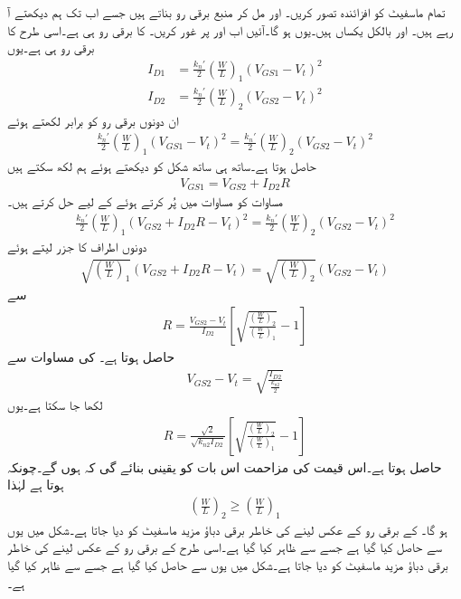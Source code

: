 تمام ماسفیٹ کو افزائندہ تصور کریں۔ اور  مل کر منبع برقی رو بناتے ہیں جسے اب تک ہم دیکھتے آ رہے ہیں۔ اور  بالکل یکساں ہیں۔یوں  ہو گا۔آئیں اب  اور  پر غور کریں۔ کا برقی رو  ہی ہے۔اسی طرح  کا برقی رو  ہی ہے۔یوں
\begin{align*}
I_{D1}&=\frac{k_n'}{2} \left(\frac{W}{L} \right)_1 \left(V_{GS1}-V_t \right)^2\\
I_{D2}&=\frac{k_n'}{2} \left(\frac{W}{L} \right)_2 \left(V_{GS2}-V_t \right)^2
\end{align*} 
ان دونوں برقی رو کو برابر لکھتے ہوئے
\begin{align}\label{مساوت_تفرقی_منبع_سے_پاک_کے_برقی_رو}
\frac{k_n'}{2} \left(\frac{W}{L} \right)_1 \left(V_{GS1}-V_t \right)^2=\frac{k_n'}{2} \left(\frac{W}{L} \right)_2 \left(V_{GS2}-V_t \right)^2
\end{align}
حاصل ہوتا ہے۔ساتھ ہی ساتھ شکل کو دیکھتے ہوئے ہم لکھ سکتے ہیں
\begin{align}\label{مساوات_تفرقی_منبع_سے_پاک_کے_تعلق}
V_{GS1}=V_{GS2}+I_{D2} R
\end{align}
مساوات  کو مساوات  میں پُر کرتے ہوئے  کے لیے حل کرتے ہیں۔
\begin{align*}
\frac{k_n'}{2} \left(\frac{W}{L} \right)_1 \left(V_{GS2}+I_{D2} R-V_t \right)^2=\frac{k_n'}{2} \left(\frac{W}{L} \right)_2 \left(V_{GS2}-V_t \right)^2
\end{align*}
دونوں اطراف کا  جزر    لیتے ہوئے
\begin{align*}
\sqrt{\left(\frac{W}{L} \right)_1} \left(V_{GS2}+I_{D2} R-V_t \right)=\sqrt{\left(\frac{W}{L} \right)_2} \left(V_{GS2}-V_t \right)
\end{align*}
سے
\begin{align*}
R=\frac{V_{GS2}-V_t}{I_{D2}} \left[ \sqrt{\frac{\left(\frac{W}{L} \right)_2}{\left(\frac{W}{L} \right)_1}} -1\right]
\end{align*}
حاصل ہوتا ہے۔ کی مساوات سے 
\begin{align*}
V_{GS2}-V_t=\sqrt{\frac{I_{D2}}{\frac{k_{n2}}{2}}}
\end{align*}
لکھا جا سکتا ہے۔یوں
\begin{align}
R=\frac{\sqrt{2}}{\sqrt{k_{n2} I_{D2}}} \left[ \sqrt{\frac{\left(\frac{W}{L} \right)_2}{\left(\frac{W}{L} \right)_1}} -1\right]
\end{align}
 حاصل ہوتا ہے۔اس قیمت کی مزاحمت اس بات کو یقینی بنائے گی کہ  ہوں گے۔چونکہ  ہوتا ہے لہٰذا
\begin{align*}
\left(\frac{W}{L} \right)_2 \ge \left(\frac{W}{L} \right)_1
\end{align*}
ہو گا۔ کے برقی رو کے عکس لینے کی خاطر   برقی دباؤ مزید ماسفیٹ کو دیا جاتا ہے۔شکل میں یوں  سے  حاصل کیا گیا ہے جسے  سے ظاہر کیا گیا ہے۔اسی طرح   کے برقی رو کے عکس لینے کی خاطر   برقی دباؤ مزید ماسفیٹ کو دیا جاتا ہے۔شکل میں یوں  سے  حاصل کیا گیا ہے جسے  سے ظاہر کیا گیا ہے۔

